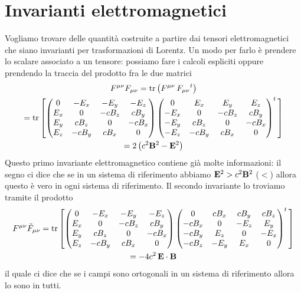 \section{Invarianti elettromagnetici}
Vogliamo trovare delle quantità costruite a partire dai tensori elettromagnetici che siano invarianti per trasformazioni di Lorentz. Un modo per farlo è 
prendere lo scalare associato a un tensore: possiamo fare i calcoli espliciti oppure prendendo la traccia del prodotto fra le due matrici
\begin{gather}
  F^{\mu \nu} F_{\mu \nu} = \text{tr} \left( F^{\mu \nu} \, F_{\mu \nu}{}^t \right)
  \\
  = \text{tr} \left[  
  \begin{pmatrix}
    0 & -E_x & -E_y & -E_z \\
    E_x & 0 & -c B_z & c B_y \\
    E_y & c B_z & 0 & -c B_x \\
    E_z & -c B_y & c B_x & 0 
  \end{pmatrix}
  \begin{pmatrix}
    0 & E_x & E_y & E_z \\
    -E_x & 0 & -c B_z & c B_y \\
    -E_y & c B_z & 0 & -c B_x \\
    -E_z & -c B_y & c B_x & 0 
  \end{pmatrix}^t \,
  \right]
  \\
  = 2 \left( c^2\mathbf{B}^2 - \mathbf{E}^2 \right) 
\end{gather}
Questo primo invariante elettromagnetico contiene già molte informazioni: il segno ci dice che se in un sistema di riferimento abbiamo 
$ \mathbf{E}^2 > c^2\mathbf{B}^2 $ ($ < $) allora questo è vero in ogni sistema di riferimento. 
Il secondo invariante lo troviamo tramite il prodotto
\begin{gather}
  F^{\mu \nu} \tilde{F}_{\mu \nu} = \text{tr} \left[  
  \begin{pmatrix}
    0 & -E_x & -E_y & -E_z \\
    E_x & 0 & -c B_z & c B_y \\
    E_y & c B_z & 0 & -c B_x \\
    E_z & -c B_y & c B_x & 0 
  \end{pmatrix}
  \begin{pmatrix}
    0 & c B_x & cB_y & cB_z \\
    -c B_x & 0 & -E_z & E_y \\
    -c B_y & E_z & 0 & -E_x \\
    -c B_z & -E_y & E_x & 0 
  \end{pmatrix}^t \,
  \right]
  \\
  = - 4 c^2 \, \mathbf{E} \cdot \mathbf{B}
\end{gather}
il quale ci dice che se i campi sono ortogonali in un sistema di riferimento allora lo sono in tutti.

